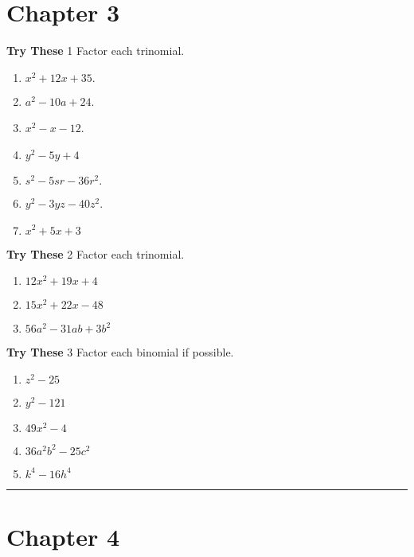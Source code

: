 \documentclass[a4paper]{JAC2003}
\begin{document}
\section{Chapter 3}

\noindent\textcolor{red!75!black}{\textbf{Try These}} 1 Factor each trinomial.
\begin{enumerate}
\item $x^{2}+12 x+35 .$

\item $a^{2}-10 a+24$.

\item $x^{2}-x-12$.

\item $y^{2}-5 y+4$

\item $s^{2}-5 s r-36 r^{2} .$

\item $y^{2}-3 y z-40 z^{2}$.

\item $x^{2}+5 x+3$
\end{enumerate}

\noindent\textcolor{red!75!black}{\textbf{Try These}} 2 Factor each trinomial.
\begin{enumerate}
\item $12 x^{2}+19 x+4$

\item $15 x^{2}+22 x-48$ %

\item $56 a^{2}-31 a b+3 b^{2}$
\end{enumerate}

\noindent\textcolor{red!75!black}{\textbf{Try These}} 3 Factor each binomial if possible.
\begin{enumerate}
\item $z^{2}-25$

\item $y^{2}-121$

\item $49 x^{2}-4$

\item $36 a^{2} b^{2}-25 c^{2}$

\item $k^{4}-16 h^{4}$
\end{enumerate}
\noindent\rule[0.5ex]{\linewidth}{1pt}

\section{Chapter 4}
\end{document}
